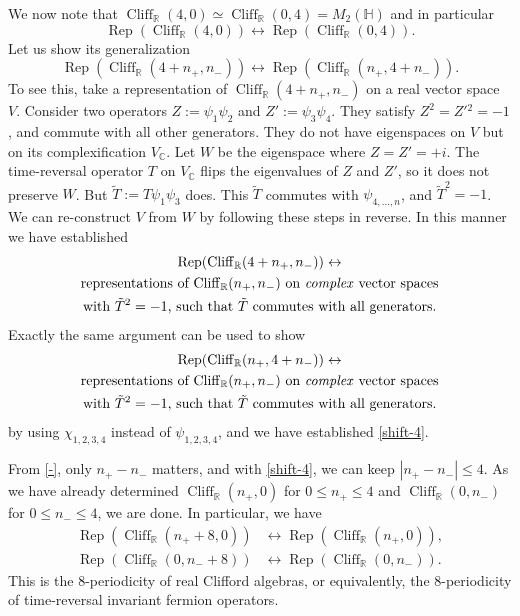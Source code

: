 \documentclass[12pt]{article}
\numberwithin{equation}{section}
\numberwithin{figure}{section}
\theoremstyle{remark}
\def\bC{\mathbb{C}}
\def\bH{\mathbb{H}}
\def\bR{\mathbb{R}}
\def\Cliff{\mathop{\mathrm{Cliff}}\nolimits}
\def\Rep{\mathop{\mathrm{Rep}}\nolimits}
\begin{document}
We now note that $\Cliff_\bR(4,0)\simeq \Cliff_\bR(0,4)=M_2(\bH)$ and in particular 
\begin{equation}
\Rep(\Cliff_\bR(4,0)) \leftrightarrow \Rep(\Cliff_\bR(0,4)) .
\end{equation}
Let us show its generalization \begin{equation}
\Rep(\Cliff_\bR(4+n_+,n_-)) \leftrightarrow \Rep(\Cliff_\bR(n_+,4+n_-)) .
\label{shift-4}
\end{equation}
To see this, take a representation of $\Cliff_\bR(4+n_+,n_-)$ on a real vector space $V$.
Consider two operators $Z:=\psi_1\psi_2$ and $Z':=\psi_3\psi_4$.
They satisfy $Z^2=Z'{}^2=-1$, and commute with all other generators.
They do not have eigenspaces on $V$ but on its complexification $V_\bC$.
Let $W$ be the eigenspace where $Z=Z'=+i$.
The time-reversal operator $T$ on $V_\bC$ flips the eigenvalues of $Z$ and $Z'$,
so it does not preserve $W$.
But $\tilde T:=T\psi_1\psi_3$ does.
This $\tilde T$ commutes with $\psi_{4,\ldots, n}$, and $\tilde T^2=-1$.
We can re-construct  $V$ from $W$ by following these steps in reverse.
In this manner we have established \begin{multline}
\Rep(\Cliff_\bR(4+n_+,n_-)) \leftrightarrow  \\
\text{representations of $\Cliff_\bR(n_+,n_-)$ on \emph{complex} vector spaces}\\
\text{with  $\tilde T^2=-1$, such that $\tilde T$ commutes with all generators}.
\end{multline}
Exactly the same argument can be used to show \begin{multline}
\Rep(\Cliff_\bR(n_+,4+n_-)) \leftrightarrow  \\
\text{representations of $\Cliff_\bR(n_+,n_-)$ on \emph{complex} vector spaces}\\
\text{with  $\tilde T^2=-1$, such that $\tilde T$ commutes with all generators}.
\end{multline} by using $\chi_{1,2,3,4}$ instead of $\psi_{1,2,3,4}$,
and we have established \eqref{shift-4}.

From \eqref{-}, only $n_+-n_-$ matters, and with \eqref{shift-4}, we can keep $|n_+-n_-|\le 4$.
As we have already determined $\Cliff_\bR(n_+,0)$ for $0\le n_+\le 4$
and $\Cliff_\bR(0,n_-)$ for $0 \le n_-\le 4$, we are done.
In particular, we have \begin{equation}
\begin{aligned}
\Rep(\Cliff_\bR(n_++8,0)) &\leftrightarrow \Rep(\Cliff_\bR(n_+,0)) ,\\
\Rep(\Cliff_\bR(0,n_-+8)) &\leftrightarrow \Rep(\Cliff_\bR(0,n_-)) .
\end{aligned}
\end{equation}
This is the 8-periodicity of real Clifford algebras, or equivalently,
the 8-periodicity of time-reversal invariant fermion operators.
\end{document}
